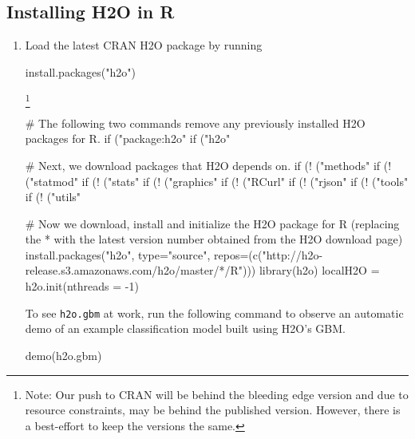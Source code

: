 \documentclass{article}[11pt]
\begin{document}
\subsection{Installing H2O in R}
\begin{enumerate}
\item Load the latest CRAN H2O package by running \begin{spverbatim} install.packages("h2o") \end{spverbatim}\footnote{Note: Our push to CRAN will be behind the bleeding edge version and due to resource constraints, may be behind the published version. However, there is a best-effort to keep the versions the same.} 

\footnotesize %
\begin{spverbatim}
# The following two commands remove any previously installed H2O packages for R.
if ("package:h2o" %
if ("h2o" %

# Next, we download packages that H2O depends on.
if (! ("methods" %
if (! ("statmod" %
if (! ("stats" %
if (! ("graphics" %
if (! ("RCurl" %
if (! ("rjson" %
if (! ("tools" %
if (! ("utils" %
\end{spverbatim}
\begin{spverbatim}
# Now we download, install and initialize the H2O package for R (replacing
the * with the latest version number obtained from the H2O download page)
install.packages("h2o", type="source", repos=(c("http://h2o-release.s3.amazonaws.com/h2o/master/*/R")))
library(h2o)
localH2O = h2o.init(nthreads = -1)
\end{spverbatim}
\normalsize%
To see {\texttt{h2o.gbm}} at work, run the following command to observe an automatic demo of an example classification model built using H2O's GBM.

\begin{spverbatim}
demo(h2o.gbm)
\end{spverbatim}
\end{enumerate}
\end{document}
